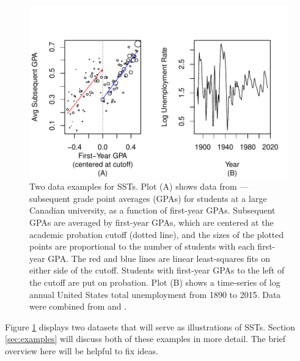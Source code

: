 \documentclass[12pt]{article}\usepackage[]{graphicx}\usepackage[]{color}
\makeatletter
\def\maxwidth{ %
  \ifdim\Gin@nat@width>\linewidth
    \linewidth
  \else
    \Gin@nat@width
  \fi
}
\makeatother
\begin{document}
\begin{figure}

\includegraphics[width=\maxwidth]{figure/examplePlots-1} 

\caption{Two data examples for SSTs. Plot (A) shows data from
  \citet{lso}---subsequent grade point averages (GPAs) for students
  at a large Canadian university, as a function of first-year
  GPAs. Subsequent GPAs are averaged by first-year GPAs, which are
  centered at the academic probation cutoff (dotted line), and the sizes
  of the plotted points are proportional to the number of students
  with each first-year GPA. The red and blue lines are linear least-squares
  fits on either side of the cutoff. Students with first-year GPAs
  to the left of  the cutoff are put on probation. Plot (B) shows a
  time-series of log annual United States total unemployment from 1890 to
  2015. Data were combined from \citet{urca} and \citet{cps}.}
\label{fig:example}
\end{figure}


Figure \ref{fig:example} displays two datasets that will serve as
illustrations of SSTs.
Section \ref{sec:examples} will discuss both of these examples in more
detail.
The brief overview here will be helpful to fix ideas.
\end{document}

